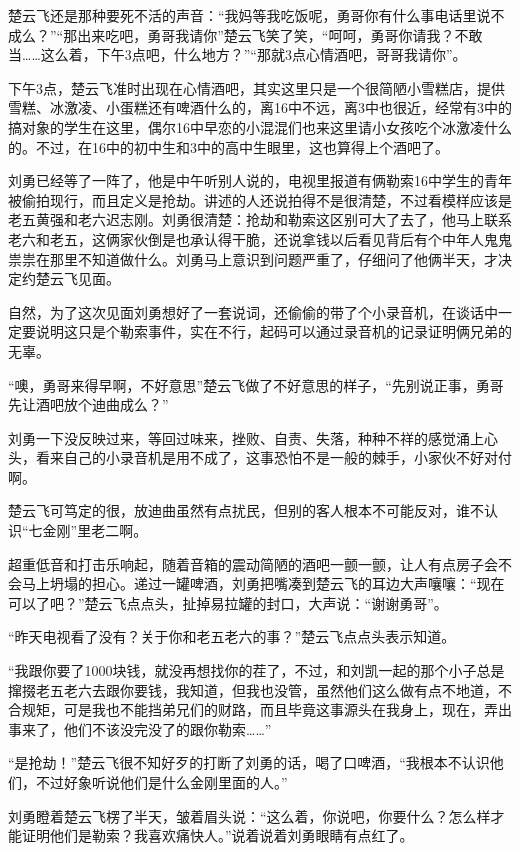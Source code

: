 楚云飞还是那种要死不活的声音：“我妈等我吃饭呢，勇哥你有什么事电话里说不成么？”“那出来吃吧，勇哥我请你”楚云飞笑了笑，“呵呵，勇哥你请我？不敢当……这么着，下午3点吧，什么地方？”“那就3点心情酒吧，哥哥我请你”。

下午3点，楚云飞准时出现在心情酒吧，其实这里只是一个很简陋小雪糕店，提供雪糕、冰激凌、小蛋糕还有啤酒什么的，离16中不远，离3中也很近，经常有3中的搞对象的学生在这里，偶尔16中早恋的小混混们也来这里请小女孩吃个冰激凌什么的。不过，在16中的初中生和3中的高中生眼里，这也算得上个酒吧了。

刘勇已经等了一阵了，他是中午听别人说的，电视里报道有俩勒索16中学生的青年被偷拍现行，而且定义是抢劫。讲述的人还说拍得不是很清楚，不过看模样应该是老五黄强和老六迟志刚。刘勇很清楚：抢劫和勒索这区别可大了去了，他马上联系老六和老五，这俩家伙倒是也承认得干脆，还说拿钱以后看见背后有个中年人鬼鬼祟祟在那里不知道做什么。刘勇马上意识到问题严重了，仔细问了他俩半天，才决定约楚云飞见面。

自然，为了这次见面刘勇想好了一套说词，还偷偷的带了个小录音机，在谈话中一定要说明这只是个勒索事件，实在不行，起码可以通过录音机的记录证明俩兄弟的无辜。

“噢，勇哥来得早啊，不好意思”楚云飞做了不好意思的样子，“先别说正事，勇哥先让酒吧放个迪曲成么？”

刘勇一下没反映过来，等回过味来，挫败、自责、失落，种种不祥的感觉涌上心头，看来自己的小录音机是用不成了，这事恐怕不是一般的棘手，小家伙不好对付啊。

楚云飞可笃定的很，放迪曲虽然有点扰民，但别的客人根本不可能反对，谁不认识“七金刚”里老二啊。

超重低音和打击乐响起，随着音箱的震动简陋的酒吧一颤一颤，让人有点房子会不会马上坍塌的担心。递过一罐啤酒，刘勇把嘴凑到楚云飞的耳边大声嚷嚷：“现在可以了吧？”楚云飞点点头，扯掉易拉罐的封口，大声说：“谢谢勇哥”。

“昨天电视看了没有？关于你和老五老六的事？”楚云飞点点头表示知道。

“我跟你要了1000块钱，就没再想找你的茬了，不过，和刘凯一起的那个小子总是撺掇老五老六去跟你要钱，我知道，但我也没管，虽然他们这么做有点不地道，不合规矩，可是我也不能挡弟兄们的财路，而且毕竟这事源头在我身上，现在，弄出事来了，他们不该没完没了的跟你勒索……”

“是抢劫！”楚云飞很不知好歹的打断了刘勇的话，喝了口啤酒，“我根本不认识他们，不过好象听说他们是什么金刚里面的人。”

刘勇瞪着楚云飞楞了半天，皱着眉头说：“这么着，你说吧，你要什么？怎么样才能证明他们是勒索？我喜欢痛快人。”说着说着刘勇眼睛有点红了。

